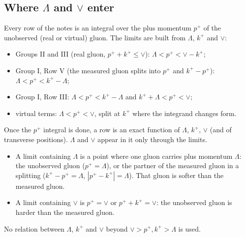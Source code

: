 \documentclass[10pt]{article}
\numberwithin{equation}{section}
\begin{document}
\subsection{Where \texorpdfstring{$\Lambda$}{Lambda} and \texorpdfstring{$\vee$}{vee} enter}\label{sec:enter}
Every row of the notes is an integral over the plus momentum $p^+$ of the unobserved (real or virtual) gluon. The limits are built from $\Lambda$, $k^+$ and $\vee$:
\begin{itemize}
\item Groups II and III (real gluon, $p^++k^+\le\vee$): $\Lambda<p^+<\vee-k^+$;
\item Group I, Row V (the measured gluon splits into $p^+$ and $k^+-p^+$): $\Lambda<p^+<k^+-\Lambda$;
\item Group I, Row III: $\Lambda<p^+<k^+-\Lambda$ and $k^++\Lambda<p^+<\vee$;
\item virtual terms: $\Lambda<p^+<\vee$, split at $k^+$ where the integrand changes form.
\end{itemize}
Once the $p^+$ integral is done, a row is an exact function of $\Lambda$, $k^+$, $\vee$ (and of transverse positions). $\Lambda$ and $\vee$ appear in it only through the limits.
\begin{itemize}
\item A limit containing $\Lambda$ is a point where one gluon carries plus momentum $\Lambda$: the unobserved gluon ($p^+=\Lambda$), or the partner of the measured gluon in a splitting ($k^+-p^+=\Lambda$, $|p^+-k^+|=\Lambda$). That gluon is softer than the measured gluon.
\item A limit containing $\vee$ is $p^+=\vee$ or $p^++k^+=\vee$: the unobserved gluon is harder than the measured gluon.
\end{itemize}
No relation between $\Lambda$, $k^+$ and $\vee$ beyond $\vee>p^+,k^+>\Lambda$ is used.
\end{document}
